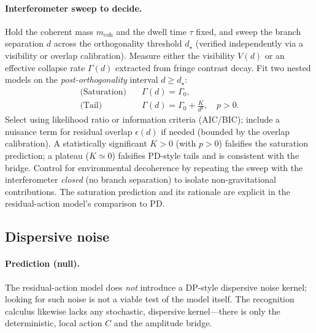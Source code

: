 \documentclass[11pt,letterpaper]{article}
\theoremstyle{definition}
\begin{document}
\paragraph{Interferometer sweep to decide.}
Hold the coherent mass $m_{\mathrm{coh}}$ and the dwell time $\tau$ fixed, and sweep the branch separation $d$ across the orthogonality threshold $d_\star$ (verified independently via a visibility or overlap calibration). Measure either the visibility $V(d)$ or an effective collapse rate $\Gamma(d)$ extracted from fringe contrast decay. Fit two nested models on the \emph{post-orthogonality} interval $d\ge d_\star$:
\begin{align}
\text{(Saturation)}\quad & \Gamma(d)=\Gamma_0, \\
\text{(Tail)}\quad & \Gamma(d)=\Gamma_0 + \frac{K}{d^{p}},\quad p>0.
\end{align}
Select using likelihood ratio or information criteria (AIC/BIC); include a nuisance term for residual overlap $\epsilon(d)$ if needed (bounded by the overlap calibration). A statistically significant $K>0$ (with $p>0$) falsifies the saturation prediction; a plateau ($K\simeq 0$) falsifies PD-style tails and is consistent with the bridge. Control for environmental decoherence by repeating the sweep with the interferometer \emph{closed} (no branch separation) to isolate non-gravitational contributions. The saturation prediction and its rationale are explicit in the residual-action model’s comparison to PD.
\subsection{Dispersive noise}

\paragraph{Prediction (null).}
The residual-action model does \emph{not} introduce a DP-style dispersive noise kernel; looking for such noise is not a viable test of the model itself. The recognition calculus likewise lacks any stochastic, dispersive kernel—there is only the deterministic, local action $C$ and the amplitude bridge.
\end{document}
